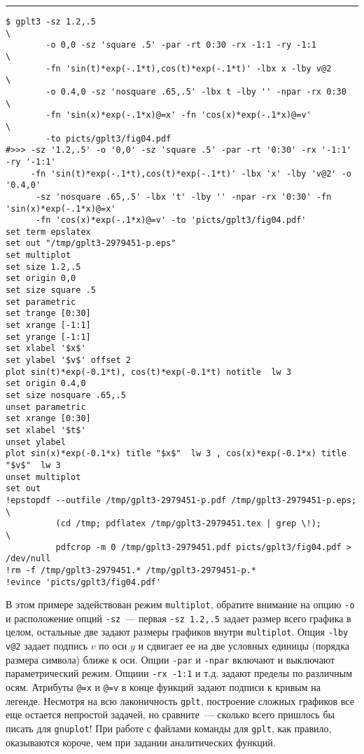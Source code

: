 \documentclass[12pt]{article}
\def\gplt{{\tt gplt}}
\def\gnuplot{{\tt gnuplot}}
\begin{document}
\hrule %

\vspace{3mm}
{\small
\begin{verbatim}
$ gplt3 -sz 1.2,.5                                                              \
        -o 0,0 -sz 'square .5' -par -rt 0:30 -rx -1:1 -ry -1:1                  \
        -fn 'sin(t)*exp(-.1*t),cos(t)*exp(-.1*t)' -lbx x -lby v@2               \
        -o 0.4,0 -sz 'nosquare .65,.5' -lbx t -lby '' -npar -rx 0:30            \
        -fn 'sin(x)*exp(-.1*x)@=x' -fn 'cos(x)*exp(-.1*x)@=v'                   \
        -to picts/gplt3/fig04.pdf 
#>>> -sz '1.2,.5' -o '0,0' -sz 'square .5' -par -rt '0:30' -rx '-1:1' -ry '-1:1' 
     -fn 'sin(t)*exp(-.1*t),cos(t)*exp(-.1*t)' -lbx 'x' -lby 'v@2' -o '0.4,0' 
      -sz 'nosquare .65,.5' -lbx 't' -lby '' -npar -rx '0:30' -fn 'sin(x)*exp(-.1*x)@=x' 
      -fn 'cos(x)*exp(-.1*x)@=v' -to 'picts/gplt3/fig04.pdf'
set term epslatex 
set out "/tmp/gplt3-2979451-p.eps"
set multiplot
set size 1.2,.5
set origin 0,0
set size square .5
set parametric
set trange [0:30]
set xrange [-1:1]
set yrange [-1:1]
set xlabel '$x$'
set ylabel '$v$' offset 2
plot sin(t)*exp(-0.1*t), cos(t)*exp(-0.1*t) notitle  lw 3 
set origin 0.4,0
set size nosquare .65,.5
unset parametric
set xrange [0:30]
set xlabel '$t$'
unset ylabel
plot sin(x)*exp(-0.1*x) title "$x$"  lw 3 , cos(x)*exp(-0.1*x) title "$v$"  lw 3 
unset multiplot
set out
!epstopdf --outfile /tmp/gplt3-2979451-p.pdf /tmp/gplt3-2979451-p.eps;        \
          (cd /tmp; pdflatex /tmp/gplt3-2979451.tex | grep \!);               \
          pdfcrop -m 0 /tmp/gplt3-2979451.pdf picts/gplt3/fig04.pdf > /dev/null
!rm -f /tmp/gplt3-2979451.* /tmp/gplt3-2979451-p.*
!evince 'picts/gplt3/fig04.pdf'\end{verbatim}
  }

  \begin{center}
  \epsfig{file=picts/gplt3/fig04}
\end{center}
В этом примере задействован режим \verb'multiplot', обратите внимание на опцию \verb'-o' и расположение опций \verb'-sz'~---
первая \verb'-sz 1.2,.5' задает размер всего графика в целом, остальные две задают размеры графиков внутри \verb'multiplot'.
Опция \verb'-lby v@2' задает подпись $v$ по оси $y$ и сдвигает ее на две условных единицы (порядка размера символа) ближе к оси. Опции \verb'-par' и \verb'-npar'
включают и выключают параметрический режим. Опциии \verb'-rx -1:1' и т.д. задают пределы по различным осям. Атрибуты \verb'@=x' и  \verb'@=v' в конце функций
задают подписи к кривым на легенде.
Несмотря на всю лаконичность \gplt, построение сложных графиков все еще остается непростой задачей, но сравните~--- сколько всего пришлось бы писать для \gnuplot!
При работе с файлами команды для \gplt{}, как правило, оказываются короче, чем при задании  аналитических функций.\\
\end{document}
